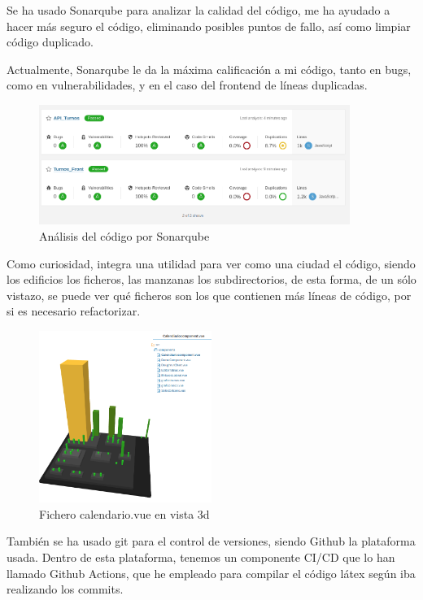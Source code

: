 \documentclass[11pt,spanish,listoffigures,listoftables]{tfgetsinf}
\begin{document}
Se ha usado Sonarqube para analizar la calidad del código, me ha ayudado a hacer más seguro el código, eliminando posibles puntos de fallo, así como limpiar código duplicado.

Actualmente, Sonarqube le da la máxima calificación a mi código, tanto en bugs, como en vulnerabilidades, y en el caso del frontend de líneas duplicadas.

\begin{figure}[h!] %
  \centering
   \includegraphics[width=0.90\textwidth]{img/estadosonar.png}
   \caption{Análisis del código por Sonarqube}
   \label{fig:estadosonar}
 \end{figure}
\clearpage
Como curiosidad, integra una utilidad para ver como una ciudad el código, siendo los edificios los ficheros, las manzanas los subdirectorios, de esta forma, de un sólo vistazo, se puede ver qué ficheros son los que contienen más líneas de código, por si es necesario refactorizar.

\begin{figure}[h!] %
  \centering
   \includegraphics[width=0.50\textwidth]{img/calendarioSonarqube.png}
   \caption{Fichero calendario.vue en vista 3d}
   \label{fig:calendariosonar}
 \end{figure}

También se ha usado git para el control de versiones, siendo Github la plataforma usada. Dentro de esta plataforma, tenemos un componente CI/CD que lo han llamado Github Actions, que he empleado para compilar el código látex según iba realizando los commits.
\end{document}
